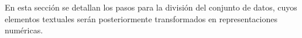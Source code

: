 En esta sección se detallan los pasos para la división del conjunto de datos, cuyos elementos textuales serán posteriormente transformados en representaciones numéricas.
